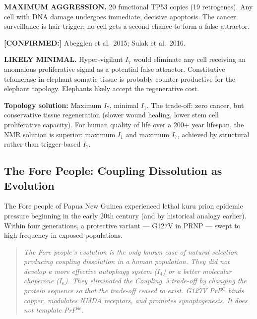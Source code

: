 \documentclass[12pt,a4paper]{article}
\newcommand{\prpc}{PrP$^{\mathrm{C}}$}
\newcommand{\prpsc}{PrP$^{\mathrm{Sc}}$}
\newcommand{\confirmed}[1]{\noindent\colorbox{green!10}{\parbox{\dimexpr\linewidth-2\fboxsep}{%
  \textbf{[CONFIRMED:]} #1}}\vspace{0.4em}}
\newcommand{\Inet}[1]{$I_{#1}$}
\begin{document}
\begin{description}[leftmargin=2em]
  \item[\Inet{7} (cancer surveillance):] \textbf{MAXIMUM AGGRESSION.}
    20 functional TP53 copies (19 retrogenes). Any cell with DNA damage
    undergoes immediate, decisive apoptosis. The cancer surveillance is
    hair-trigger: no cell gets a second chance to form a false attractor.
    \confirmed{Abegglen et al.\ 2015; Sulak et al.\ 2016.}

  \item[\Inet{1} (telomere):] \textbf{LIKELY MINIMAL.} Hyper-vigilant
    \Inet{7} would eliminate any cell receiving an anomalous proliferative
    signal as a potential false attractor. Constitutive telomerase in
    elephant somatic tissue is probably counter-productive for the elephant
    topology. Elephants likely accept the regenerative cost.
\end{description}

\textbf{Topology solution:} Maximum \Inet{7}, minimal \Inet{1}. The trade-off:
zero cancer, but conservative tissue regeneration (slower wound healing,
lower stem cell proliferative capacity). For human quality of life over a
200+ year lifespan, the NMR solution is superior: maximum \Inet{1} and
maximum \Inet{7}, achieved by structural rather than trigger-based \Inet{7}.

\subsection{The Fore People: Coupling Dissolution as Evolution}

The Fore people of Papua New Guinea experienced lethal kuru prion epidemic
pressure beginning in the early 20th century (and by historical analogy
earlier). Within four generations, a protective variant --- G127V in PRNP
--- swept to high frequency in exposed populations.

\begin{quote}
\textit{The Fore people's evolution is the only known case of natural
selection producing coupling dissolution in a human population. They did not
develop a more effective autophagy system (\Inet{4}) or a better molecular
chaperone (\Inet{6}). They eliminated the Coupling~3 trade-off by changing
the protein sequence so that the trade-off ceased to exist. G127V \prpc{}
binds copper, modulates NMDA receptors, and promotes synaptogenesis. It does
not template \prpsc{}.}
\end{quote}
\end{document}
